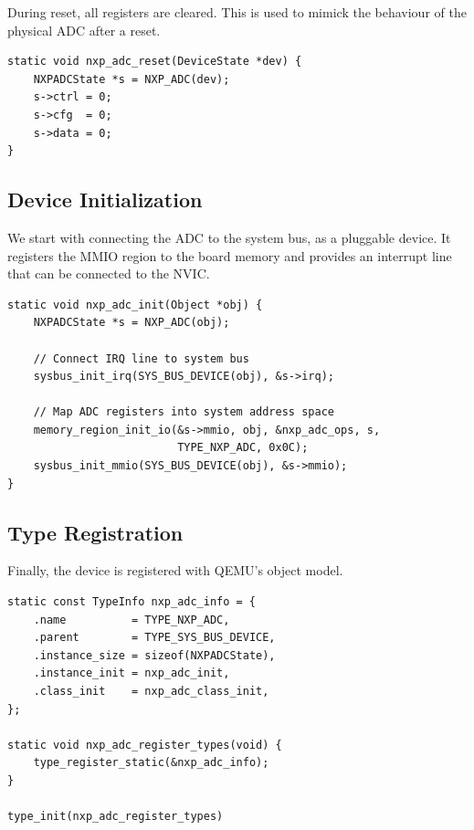 \documentclass{article}
\begin{document}
During reset, all registers are cleared. This is used to mimick the behaviour of the
physical ADC after a reset.

\begin{verbatim}
static void nxp_adc_reset(DeviceState *dev) {
    NXPADCState *s = NXP_ADC(dev);
    s->ctrl = 0;
    s->cfg  = 0;
    s->data = 0;
}
\end{verbatim}

\subsection{Device Initialization}

We start with connecting the ADC to the system bus, as a pluggable device. 
It registers the MMIO region to the board memory and provides an interrupt line that can
be connected to the NVIC.

\begin{verbatim}
static void nxp_adc_init(Object *obj) {
    NXPADCState *s = NXP_ADC(obj);

    // Connect IRQ line to system bus
    sysbus_init_irq(SYS_BUS_DEVICE(obj), &s->irq);

    // Map ADC registers into system address space
    memory_region_init_io(&s->mmio, obj, &nxp_adc_ops, s,
                          TYPE_NXP_ADC, 0x0C);
    sysbus_init_mmio(SYS_BUS_DEVICE(obj), &s->mmio);
}
\end{verbatim}

\subsection{Type Registration}

Finally, the device is registered with QEMU’s object model.  

\begin{verbatim}
static const TypeInfo nxp_adc_info = {
    .name          = TYPE_NXP_ADC,
    .parent        = TYPE_SYS_BUS_DEVICE,
    .instance_size = sizeof(NXPADCState),
    .instance_init = nxp_adc_init,
    .class_init    = nxp_adc_class_init,
};

static void nxp_adc_register_types(void) {
    type_register_static(&nxp_adc_info);
}

type_init(nxp_adc_register_types)
\end{verbatim}
\end{document}
